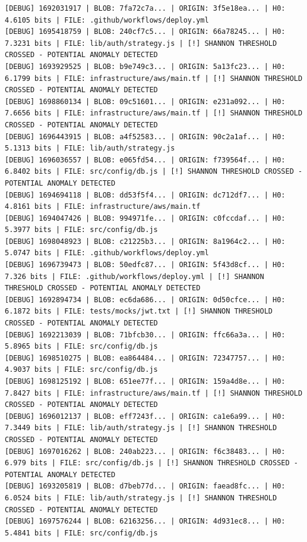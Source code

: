 \documentclass[12pt, a4paper, oneside]{report}
\begin{document}
\begin{lstlisting}[basicstyle=\tiny\ttfamily]
[DEBUG] 1692031917 | BLOB: 7fa72c7a... | ORIGIN: 3f5e18ea... | H0: 4.6105 bits | FILE: .github/workflows/deploy.yml
[DEBUG] 1695418759 | BLOB: 240cf7c5... | ORIGIN: 66a78245... | H0: 7.3231 bits | FILE: lib/auth/strategy.js | [!] SHANNON THRESHOLD CROSSED - POTENTIAL ANOMALY DETECTED
[DEBUG] 1693929525 | BLOB: b9e749c3... | ORIGIN: 5a13fc23... | H0: 6.1799 bits | FILE: infrastructure/aws/main.tf | [!] SHANNON THRESHOLD CROSSED - POTENTIAL ANOMALY DETECTED
[DEBUG] 1698860134 | BLOB: 09c51601... | ORIGIN: e231a092... | H0: 7.6656 bits | FILE: infrastructure/aws/main.tf | [!] SHANNON THRESHOLD CROSSED - POTENTIAL ANOMALY DETECTED
[DEBUG] 1696443915 | BLOB: a4f52583... | ORIGIN: 90c2a1af... | H0: 5.1313 bits | FILE: lib/auth/strategy.js
[DEBUG] 1696036557 | BLOB: e065fd54... | ORIGIN: f739564f... | H0: 6.8402 bits | FILE: src/config/db.js | [!] SHANNON THRESHOLD CROSSED - POTENTIAL ANOMALY DETECTED
[DEBUG] 1694694118 | BLOB: dd53f5f4... | ORIGIN: dc712df7... | H0: 4.8161 bits | FILE: infrastructure/aws/main.tf
[DEBUG] 1694047426 | BLOB: 994971fe... | ORIGIN: c0fccdaf... | H0: 5.3977 bits | FILE: src/config/db.js
[DEBUG] 1698048923 | BLOB: c21225b3... | ORIGIN: 8a1964c2... | H0: 5.0747 bits | FILE: .github/workflows/deploy.yml
[DEBUG] 1696739473 | BLOB: 50edfc87... | ORIGIN: 5f43d8cf... | H0: 7.326 bits | FILE: .github/workflows/deploy.yml | [!] SHANNON THRESHOLD CROSSED - POTENTIAL ANOMALY DETECTED
[DEBUG] 1692894734 | BLOB: ec6da686... | ORIGIN: 0d50cfce... | H0: 6.1872 bits | FILE: tests/mocks/jwt.txt | [!] SHANNON THRESHOLD CROSSED - POTENTIAL ANOMALY DETECTED
[DEBUG] 1692213039 | BLOB: 71bfcb30... | ORIGIN: ffc66a3a... | H0: 5.8965 bits | FILE: src/config/db.js
[DEBUG] 1698510275 | BLOB: ea864484... | ORIGIN: 72347757... | H0: 4.9037 bits | FILE: src/config/db.js
[DEBUG] 1698125192 | BLOB: 651ee77f... | ORIGIN: 159a4d8e... | H0: 7.8427 bits | FILE: infrastructure/aws/main.tf | [!] SHANNON THRESHOLD CROSSED - POTENTIAL ANOMALY DETECTED
[DEBUG] 1696012137 | BLOB: eff7243f... | ORIGIN: ca1e6a99... | H0: 7.3449 bits | FILE: lib/auth/strategy.js | [!] SHANNON THRESHOLD CROSSED - POTENTIAL ANOMALY DETECTED
[DEBUG] 1697016262 | BLOB: 240ab223... | ORIGIN: f6c38483... | H0: 6.979 bits | FILE: src/config/db.js | [!] SHANNON THRESHOLD CROSSED - POTENTIAL ANOMALY DETECTED
[DEBUG] 1693205819 | BLOB: d7beb77d... | ORIGIN: faead8fc... | H0: 6.0524 bits | FILE: lib/auth/strategy.js | [!] SHANNON THRESHOLD CROSSED - POTENTIAL ANOMALY DETECTED
[DEBUG] 1697576244 | BLOB: 62163256... | ORIGIN: 4d931ec8... | H0: 5.4841 bits | FILE: src/config/db.js

\end{lstlisting}
\end{document}
